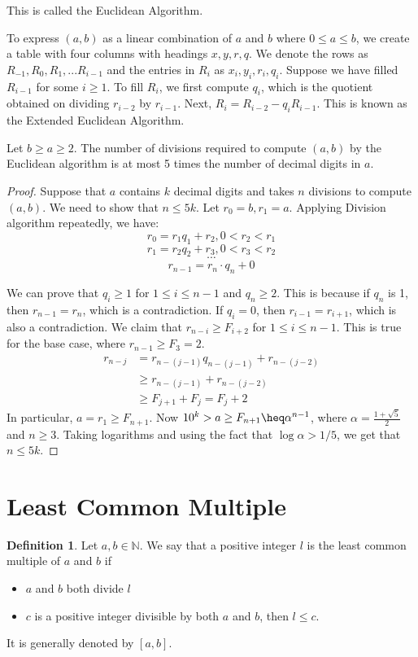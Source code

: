 \documentclass[12pt,letterpaper]{amsbook}
\theoremstyle{definition}
\newtheorem{definition}{Definition} %
\newcommand{\N}{\mathbb{N}}
\begin{document}
This is called the Euclidean Algorithm. 

To express $(a,b)$ as a linear combination of $a$ and $b$ where $0 \leq a \leq b$, we create a table with four columns with headings $x,y,r,q$. We denote the rows as $R_{-1}, R_0, R_1, ... R_{i-1}$ and the entries in $R_i$ as $x_i,y_i,r_i,q_i$. Suppose we have filled $R_{i-1}$ for some $i \geq 1$. To fill $R_i$, we first compute $q_i$, which is the quotient obtained on dividing $r_{i-2}$ by $r_{i-1}$. Next, $R_i = R_{i-2} - q_iR_{i-1}$. This is known as the Extended Euclidean Algorithm.

\begin{theorem}
  Let $b \geq a \geq 2$. The number of divisions required to compute $(a,b)$ by the Euclidean algorithm is at most 5 times the number of decimal digits in $a$.  
\end{theorem}

\begin{proof}
  Suppose that $a$ contains $k$ decimal digits and takes $n$ divisions to compute $(a,b)$. We need to show that $n \leq 5k$. Let $r_0 = b, r_1 = a$. Applying Division algorithm repeatedly, we have:
  \[r_0 = r_1q_1+r_2, 0 < r_2 < r_1\]
  \[r_1 = r_2q_2+r_3, 0 < r_3 < r_2\]
  \[\cdots\]
  \[r_{n-1} = r_n \cdot q_n + 0\]

  We can prove that $q_i \geq 1$ for $1 \leq i \leq n-1$ and $q_n \geq 2$. This is because if $q_n$ is 1, then $r_{n-1} = r_n$, which is a contradiction. If $q_i = 0$, then $r_{i-1} = r_{i+1}$, which is also a contradiction.
  We claim that $r_{n-i} \geq F_{i+2}$ for $1 \leq i \leq n-1$. This is true for the base case, where $r_{n-1} \geq F_3 = 2$. 
  \begin{align*}
    r_{n-j} &= r_{n-(j-1)}q_{n-(j-1)} + r_{n-(j-2)}\\
            &\geq r_{n-(j-1)} + r_{n-(j-2)}\\
            &\geq F_{j+1} + F_j = F_j+2
  \end{align*}
  In particular, $a = r_1 \geq F_{n+1}$. Now $10^k > a \geq F_{n+1} \heq \alpha^{n-1}$, where $\alpha = \frac{1+\sqrt5}{2}$ and $n \geq 3$. Taking logarithms and using the fact that $\log \alpha > 1/5$, we get that $n \leq 5k$.
\end{proof}

\section{Least Common Multiple}

\begin{definition}
  Let $a,b \in \N$. We say that a positive integer $l$ is the least common multiple of $a$ and $b$ if 
  \begin{itemize}
    \item $a$ and $b$ both divide $l$
    \item $c$ is a positive integer divisible by both $a$ and $b$, then $l \leq c$.
  \end{itemize}
  It is generally denoted by $[a,b]$.
\end{definition}
\end{document}
